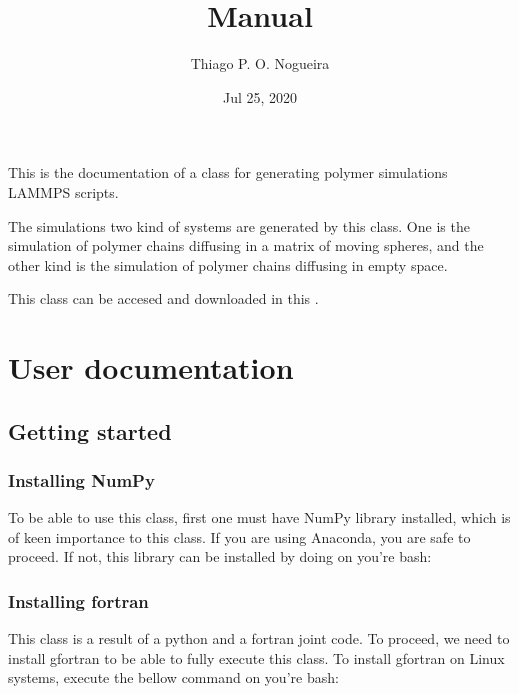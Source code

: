 \documentclass[letterpaper,10pt,english]{sphinxmanual}
\title{Manual}
\date{Jul 25, 2020}
\author{Thiago P. O. Nogueira}
\begin{document}
\pagestyle{empty}
\sphinxmaketitle
\pagestyle{plain}
\sphinxtableofcontents
\pagestyle{normal}
\label{\detokenize{index::doc}}


This is the documentation of a  class for generating polymer simulations LAMMPS scripts.

The simulations two kind of systems are generated by this class. One is the simulation of polymer chains
diffusing in a matrix of moving spheres, and the other kind is the simulation of polymer chains diffusing in empty space.

This class can be accesed and downloaded in this .


\chapter{User documentation}
\label{\detokenize{index:user-documentation}}

\section{Getting started}
\label{\detokenize{getting_started:getting-started}}\label{\detokenize{getting_started:id1}}\label{\detokenize{getting_started::doc}}

\subsection{Installing NumPy}
\label{\detokenize{getting_started:installing-numpy}}\label{\detokenize{getting_started:id2}}
To be able to use this class, first one must have NumPy library installed, which is of keen importance to this class.
If you are using Anaconda, you are safe to proceed. If not, this library can be installed by doing on you’re bash:

\begin{sphinxVerbatim}[commandchars=\\\{\}]
  
\end{sphinxVerbatim}


\subsection{Installing fortran}
\label{\detokenize{getting_started:installing-fortran}}\label{\detokenize{getting_started:id3}}
This class is a result of a python and a fortran joint code. To proceed, we need to install gfortran to be able
to fully execute this class. To install gfortran on Linux systems, execute the bellow command on you’re bash:
\end{document}
